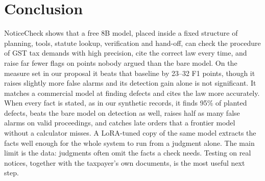\documentclass[10pt,a4paper]{article}
\begin{document}
\section{Conclusion}
NoticeCheck shows that a free 8B model, placed inside a fixed structure of planning, tools, statute lookup, verification and hand-off, can check the procedure of GST tax demands with high precision, cite the correct law every time, and raise far fewer flags on points nobody argued than the bare model. On the measure set in our proposal it beats that baseline by 23--32 F1 points, though it raises slightly more false alarms and its detection gain alone is not significant. It matches a commercial model at finding defects and cites the law more accurately. When every fact is stated, as in our synthetic records, it finds 95\% of planted defects, beats the bare model on detection as well, raises half as many false alarms on valid proceedings, and catches late orders that a frontier model without a calculator misses. A LoRA-tuned copy of the same model extracts the facts well enough for the whole system to run from a judgment alone. The main limit is the data: judgments often omit the facts a check needs. Testing on real notices, together with the taxpayer's own documents, is the most useful next step.
\end{document}
